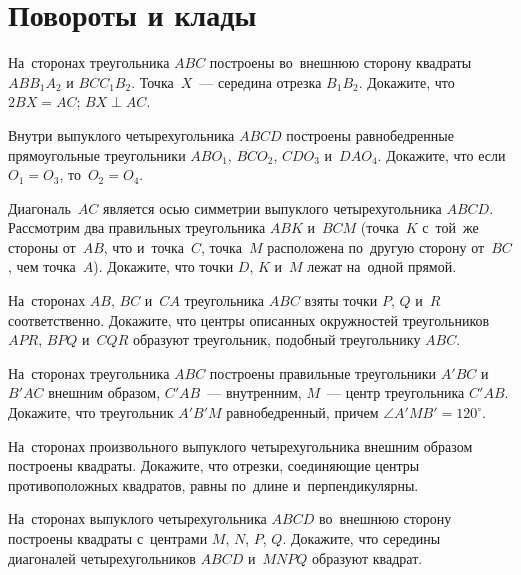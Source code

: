 
\section*{Повороты и клады}


\begin{problems}

\item
На~сторонах треугольника $ABC$ построены во~внешнюю сторону квадраты
$A B B_1 A_2$ и $B C C_1 B_2$.
Точка~$X$~--- середина отрезка $B_1 B_2$.
Докажите, что
\\
\subproblem $2 BX = AC$;
\qquad
\subproblem $BX \perp AC$.

\item
Внутри выпуклого четырехугольника $ABCD$ построены равнобедренные прямоугольные
треугольники $A B O_1$, $B C O_2$, $C D O_3$ и~$D A O_4$.
Докажите, что если $O_1 = O_3$, то~$O_2 = O_4$.

\item
Диагональ~$AC$ является осью симметрии выпуклого четырехугольника $ABCD$.
Рассмотрим два правильных треугольника $ABK$ и~$BCM$ (точка~$K$ с~той~же
стороны от~$AB$, что и~точка~$C$, точка~$M$ расположена по~другую сторону
от~$BC$, чем точка~$A$).
Докажите, что точки $D$, $K$ и~$M$ лежат на~одной прямой.

\item
На~сторонах $AB$, $BC$ и~$CA$ треугольника $ABC$ взяты точки $P$, $Q$ и~$R$
соответственно.
Докажите, что центры описанных окружностей треугольников $APR$, $BPQ$ и~$CQR$
образуют треугольник, подобный треугольнику $ABC$.

\item
На~сторонах треугольника $ABC$ построены правильные треугольники $A'BC$
и~$B'AC$ внешним образом, $C'AB$~--- внутренним,
$M$~--- центр треугольника $C'AB$.
Докажите, что треугольник $A'B'M$ равнобедренный, причем
$\angle A'MB' = 120^\circ$.

\item
На~сторонах произвольного выпуклого четырехугольника внешним образом построены
квадраты.
Докажите, что отрезки, соединяющие центры противоположных квадратов, равны
по~длине и~перпендикулярны.

\item
На~сторонах выпуклого четырехугольника $ABCD$ во~внешнюю сторону построены
квадраты с~центрами $M$, $N$, $P$, $Q$.
Докажите, что середины диагоналей четырехугольников $ABCD$ и~$MNPQ$ образуют
квадрат.


\end{problems}
